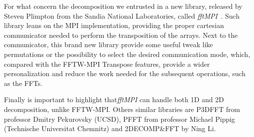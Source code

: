 \par
For what concern the decomposition we entrusted in a new library, released by Steven Plimpton from the Sandia National Laboratories, called \emph{fftMPI}~\cite{fftMPI}. Such library leans on the MPI implementation, providing the proper cartesian communicator needed to perform the transposition of the arrays. Next to the communicator, this brand new library provide some useful tweak like permutations or the possibility to select the desired communication mode, which, compared with the FFTW-MPI Transpose\cite{FFTW05}\cite{FFTW:transpose} features, provide a wider personalization and reduce the work needed for the subsequent operations, such as the FFTs. 
\par
Finally is important to highlight that\emph{fftMPI} can handle both 1D and 2D decomposition, unlike FFTW-MPI.
Others similar libraries are P3DFFT\cite{p3dfft} from professor Dmitry Pekurovsky (UCSD), PFFT from professor Michael Pippig\cite{pfft} (Technische Universitat Chemnitz) and 2DECOMP\&FFT\cite{2decomp} by Ning Li.





